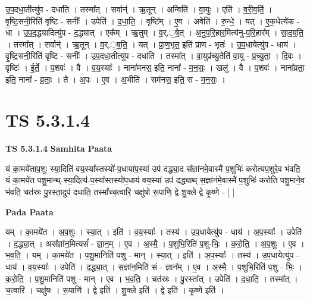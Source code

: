\documentclass[17pt]{extarticle}
\begin{document}
उ॒प॒दधा॒तीत्यु॑प - दधा॑ति । तस्मा᳚त् । सर्वान्॑ । ऋ॒तून् । अन्विति॑ । वा॒युः । एति॑ । व॒री॒व॒र्ति॒ । वृ॒ष्टि॒सनी॒रिति॑ वृष्टि - सनीः᳚ । उपेति॑ । द॒धा॒ति॒ । वृष्टि᳚म् । ए॒व । अवेति॑ । रु॒न्धे॒ । यत् । ए॒क॒धेत्ये॑क - धा । उ॒प॒द॒द्ध्यादित्यु॑प - द॒द्ध्यात् । एक᳚म् । ऋ॒तुम् । व॒र्.॒षे॒त् । अ॒नु॒प॒रि॒हार॒मित्य॑नु-प॒रि॒हार᳚म् । सा॒द॒य॒ति॒ । तस्मा᳚त् । सर्वान्॑ । ऋ॒तून् । व॒र्.॒ष॒ति॒ । यत् । प्रा॒ण॒भृत॒ इति॑ प्राण - भृतः॑ । उ॒प॒धायेत्यु॑प - धाय॑ । वृ॒ष्टि॒सनी॒रिति॑ वृष्टि - सनीः᳚ । उ॒प॒दधा॒तीत्यु॑प - दधा॑ति । तस्मा᳚त् । वा॒युप्र॑च्यु॒तेति॑ वा॒यु - प्र॒च्यु॒ता॒ । दि॒वः । वृष्टिः॑ । ई॒र्ते॒ । प॒शवः॑ । वै । व॒य॒स्याः᳚ । नाना॑मनस॒ इति॒ नाना᳚ - म॒न॒सः॒ । खलु॑ । वै । प॒शवः॑ । नाना᳚व्रता॒ इति॒ नाना᳚ - व्र॒ताः॒ । ते । अ॒पः । ए॒व । अ॒भीति॑ । सम॑नस॒ इति॒ स - म॒न॒सः॒ ।  \newline





\section{ TS 5.3.1.4 }

\textbf{TS 5.3.1.4 } \newline
\textbf{Samhita Paata} \newline

यं का॒मये॑ताप॒शुः स्या॒दिति॑ वय॒स्या᳚स्तस्यो॑-प॒धाया॑प॒स्या॑ उप॑ दद्ध्या॒द स᳚ज्ञांनमे॒वास्मै॑ प॒शुभिः॑ करोत्यप॒शुरे॒व भ॑वति॒ यं का॒मये॑त पशु॒मान्थ्-स्या॒दित्य॑-प॒स्या᳚स्तस्यो॑प॒धाय॑ वय॒स्या॑ उप॑ दद्ध्याथ् स॒ज्ञांन॑मे॒वास्मै॑ प॒शुभिः॑ करोति पशु॒माने॒व भ॑वति॒ चत॑स्रः पु॒रस्ता॒दुप॑ दधाति॒ तस्मा᳚च्च॒त्वारि॒ चक्षु॑षो रू॒पाणि॒ द्वे शु॒क्ले द्वे कृ॒ष्णे - [  ] \newline

\textbf{Pada Paata} \newline

यम् । का॒मये॑त । अ॒प॒शुः । स्या॒त् । इति॑ । व॒य॒स्याः᳚ । तस्य॑ । उ॒प॒धायेत्यु॑प - धाय॑ । अ॒प॒स्याः᳚ । उपेति॑ । द॒द्ध्या॒त् । अस᳚ज्ञांन॒मित्यसं᳚ - ज्ञा॒न॒म् । ए॒व । अ॒स्मै॒ । प॒शुभि॒रिति॑ प॒शु-भिः॒ । क॒रो॒ति॒ । अ॒प॒शुः । ए॒व । भ॒व॒ति॒ । यम् । का॒मये॑त । प॒शु॒मानिति॑ पशु - मान् । स्या॒त् । इति॑ । अ॒प॒स्याः᳚ । तस्य॑ । उ॒प॒धायेत्यु॑प - धाय॑ । व॒य॒स्याः᳚ । उपेति॑ । द॒द्ध्या॒त् । स॒ज्ञांन॒मिति॑ सं - ज्ञान᳚म् । ए॒व । अ॒स्मै॒ । प॒शुभि॒रिति॑ प॒शु - भिः॒ । क॒रो॒ति॒ । प॒शु॒मानिति॑ पशु - मान् । ए॒व । भ॒व॒ति॒ । चत॑स्रः । पु॒रस्ता᳚त् । उपेति॑ । द॒धा॒ति॒ । तस्मा᳚त् । च॒त्वारि॑ । चक्षु॑षः । रू॒पाणि॑ । द्वे इति॑ । शु॒क्ले इति॑ । द्वे इति॑ । कृ॒ष्णे इति॑ ।  \newline
\end{document}
